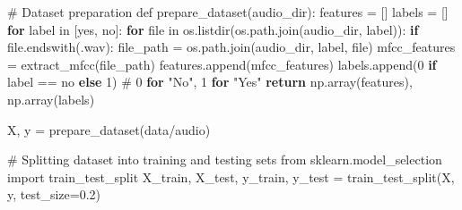 \documentclass[
  9pt,
  letterpaper,
  abstract,
  titlepage]{scrbook}
\newenvironment{Shaded}{\begin{snugshade}}{\end{snugshade}}
\newcommand{\CharTok}[1]{\textcolor[rgb]{0.13,0.47,0.30}{#1}}
\newcommand{\ControlFlowTok}[1]{\textcolor[rgb]{0.00,0.23,0.31}{\textbf{#1}}}
\newcommand{\DecValTok}[1]{\textcolor[rgb]{0.68,0.00,0.00}{#1}}
\newcommand{\ErrorTok}[1]{\textcolor[rgb]{0.68,0.00,0.00}{#1}}
\newcommand{\FloatTok}[1]{\textcolor[rgb]{0.68,0.00,0.00}{#1}}
\newcommand{\NormalTok}[1]{\textcolor[rgb]{0.00,0.23,0.31}{#1}}
\newcommand{\OperatorTok}[1]{\textcolor[rgb]{0.37,0.37,0.37}{#1}}
\newcommand{\PreprocessorTok}[1]{\textcolor[rgb]{0.68,0.00,0.00}{#1}}
\newcommand{\StringTok}[1]{\textcolor[rgb]{0.13,0.47,0.30}{#1}}
\begin{document}
\begin{Shaded}
\begin{Highlighting}[]
\PreprocessorTok{\# }\ErrorTok{Dataset preparation}
\NormalTok{def prepare\_dataset}\OperatorTok{(}\NormalTok{audio\_dir}\OperatorTok{):}
\NormalTok{    features }\OperatorTok{=} \OperatorTok{[]}
\NormalTok{    labels }\OperatorTok{=} \OperatorTok{[]}
    \ControlFlowTok{for}\NormalTok{ label in }\OperatorTok{[}\CharTok{\textquotesingle{}y}\ErrorTok{es}\CharTok{\textquotesingle{}}\OperatorTok{,} \CharTok{\textquotesingle{}n}\ErrorTok{o}\CharTok{\textquotesingle{}}\OperatorTok{]:}
        \ControlFlowTok{for}\NormalTok{ file in os}\OperatorTok{.}\NormalTok{listdir}\OperatorTok{(}\NormalTok{os}\OperatorTok{.}\NormalTok{path}\OperatorTok{.}\NormalTok{join}\OperatorTok{(}\NormalTok{audio\_dir}\OperatorTok{,}\NormalTok{ label}\OperatorTok{)):}
            \ControlFlowTok{if}\NormalTok{ file}\OperatorTok{.}\NormalTok{endswith}\OperatorTok{(}\CharTok{\textquotesingle{}.}\ErrorTok{wav}\CharTok{\textquotesingle{}}\OperatorTok{):}
\NormalTok{                file\_path }\OperatorTok{=}\NormalTok{ os}\OperatorTok{.}\NormalTok{path}\OperatorTok{.}\NormalTok{join}\OperatorTok{(}\NormalTok{audio\_dir}\OperatorTok{,}\NormalTok{ label}\OperatorTok{,}\NormalTok{ file}\OperatorTok{)}
\NormalTok{                mfcc\_features }\OperatorTok{=}\NormalTok{ extract\_mfcc}\OperatorTok{(}\NormalTok{file\_path}\OperatorTok{)}
\NormalTok{                features}\OperatorTok{.}\NormalTok{append}\OperatorTok{(}\NormalTok{mfcc\_features}\OperatorTok{)}
\NormalTok{                labels}\OperatorTok{.}\NormalTok{append}\OperatorTok{(}\DecValTok{0} \ControlFlowTok{if}\NormalTok{ label }\OperatorTok{==} \CharTok{\textquotesingle{}n}\ErrorTok{o}\CharTok{\textquotesingle{}} \ControlFlowTok{else} \DecValTok{1}\OperatorTok{)}\NormalTok{  \# }\DecValTok{0} \ControlFlowTok{for} \StringTok{"No"}\OperatorTok{,} \DecValTok{1} \ControlFlowTok{for} \StringTok{"Yes"}
    \ControlFlowTok{return}\NormalTok{ np}\OperatorTok{.}\NormalTok{array}\OperatorTok{(}\NormalTok{features}\OperatorTok{),}\NormalTok{ np}\OperatorTok{.}\NormalTok{array}\OperatorTok{(}\NormalTok{labels}\OperatorTok{)}

\NormalTok{X}\OperatorTok{,}\NormalTok{ y }\OperatorTok{=}\NormalTok{ prepare\_dataset}\OperatorTok{(}\CharTok{\textquotesingle{}d}\ErrorTok{ata/audio}\CharTok{\textquotesingle{}}\OperatorTok{)}

\PreprocessorTok{\# }\ErrorTok{Splitting dataset into training and testing sets}
\NormalTok{from sklearn}\OperatorTok{.}\NormalTok{model\_selection import train\_test\_split}
\NormalTok{X\_train}\OperatorTok{,}\NormalTok{ X\_test}\OperatorTok{,}\NormalTok{ y\_train}\OperatorTok{,}\NormalTok{ y\_test }\OperatorTok{=}\NormalTok{ train\_test\_split}\OperatorTok{(}\NormalTok{X}\OperatorTok{,}\NormalTok{ y}\OperatorTok{,}\NormalTok{ test\_size}\OperatorTok{=}\FloatTok{0.2}\OperatorTok{)}
\end{Highlighting}
\end{Shaded}
\end{document}
